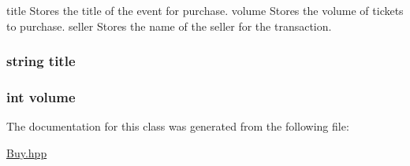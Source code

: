 title Stores the title of the event for purchase. volume Stores the volume of tickets to purchase. seller Stores the name of the seller for the transaction. \hypertarget{class_buy_a43a5eafe64b96968035e5a4013e47c75}{
\subsubsection[{title}]{\setlength{\rightskip}{0pt plus 5cm}string title\hspace{0.3cm}{\ttfamily [private]}}}\label{class_buy_a43a5eafe64b96968035e5a4013e47c75}
\hypertarget{class_buy_aed48ca0bcd2162fd4fd495873e2631f5}{
\subsubsection[{volume}]{\setlength{\rightskip}{0pt plus 5cm}int volume\hspace{0.3cm}{\ttfamily [private]}}}\label{class_buy_aed48ca0bcd2162fd4fd495873e2631f5}


The documentation for this class was generated from the following file\-:\begin{DoxyCompactItemize}
\item 
\hyperlink{_buy_8hpp}{Buy.\-hpp}\end{DoxyCompactItemize}
